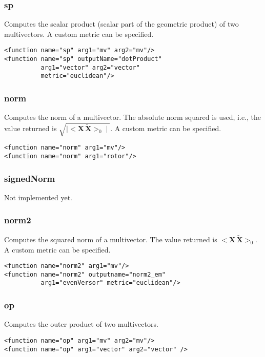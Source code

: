 \documentclass[10pt, a4paper]{article}
\newcommand{\gav}[1]{\ensuremath{\mathbf{#1}}}
\newcommand{\gp}{\,}
\newcommand{\rev}[1]{\widetilde{#1}}
\begin{document}
\subsubsection*{sp}

Computes the scalar product (scalar part of the geometric product) of two multivectors.
A custom metric can be specified.
\begin{verbatim}
<function name="sp" arg1="mv" arg2="mv"/>
<function name="sp" outputName="dotProduct" 
          arg1="vector" arg2="vector"
          metric="euclidean"/>
\end{verbatim}


\subsubsection*{norm}

Computes the norm of a multivector.
The absolute norm squared is used, i.e., the value returned is $\sqrt{ \mid < \gav{X} \gp \rev{\gav{X}} >_{0} \mid}$.
A custom metric can be specified.
\begin{verbatim}
<function name="norm" arg1="mv"/>
<function name="norm" arg1="rotor"/>
\end{verbatim}

\subsubsection*{signedNorm}

Not implemented yet.

\subsubsection*{norm2}

Computes the squared norm of a multivector.
The value returned is $< \gav{X} \gp \rev{\gav{X}} >_{0}$.
A custom metric can be specified.
\begin{verbatim}
<function name="norm2" arg1="mv"/>
<function name="norm2" outputname="norm2_em"
          arg1="evenVersor" metric="euclidean"/>
\end{verbatim}

\subsubsection*{op}

Computes the outer product of two multivectors.
\begin{verbatim}
<function name="op" arg1="mv" arg2="mv"/>
<function name="op" arg1="vector" arg2="vector" />
\end{verbatim}
\end{document}
